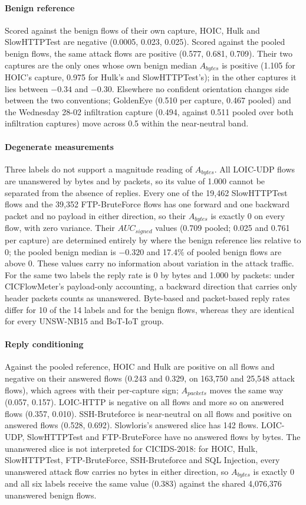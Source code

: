 \documentclass[preprint,12pt]{elsarticle}
\begin{document}
\paragraph{Benign reference} Scored against the benign flows of their own capture, HOIC, Hulk and SlowHTTPTest are negative (0.0005, 0.023, 0.025). Scored against the pooled benign flows, the same attack flows are positive (0.577, 0.681, 0.709). Their two captures are the only ones whose own benign median $A_{bytes}$ is positive (1.105 for HOIC's capture, 0.975 for Hulk's and SlowHTTPTest's); in the other captures it lies between $-0.34$ and $-0.30$. Elsewhere no confident orientation changes side between the two conventions; GoldenEye (0.510 per capture, 0.467 pooled) and the Wednesday 28-02 infiltration capture (0.494, against 0.511 pooled over both infiltration captures) move across 0.5 within the near-neutral band.

\paragraph{Degenerate measurements} Three labels do not support a magnitude reading of $A_{bytes}$. All LOIC-UDP flows are unanswered by bytes and by packets, so its value of 1.000 cannot be separated from the absence of replies. Every one of the 19{,}462 SlowHTTPTest flows and the 39{,}352 FTP-BruteForce flows has one forward and one backward packet and no payload in either direction, so their $A_{bytes}$ is exactly 0 on every flow, with zero variance. Their $AUC_{signed}$ values (0.709 pooled; 0.025 and 0.761 per capture) are determined entirely by where the benign reference lies relative to 0; the pooled benign median is $-0.320$ and 17.4\% of pooled benign flows are above 0. These values carry no information about variation in the attack traffic. For the same two labels the reply rate is 0 by bytes and 1.000 by packets: under CICFlowMeter's payload-only accounting, a backward direction that carries only header packets counts as unanswered. Byte-based and packet-based reply rates differ for 10 of the 14 labels and for the benign flows, whereas they are identical for every UNSW-NB15 and BoT-IoT group.

\paragraph{Reply conditioning} Against the pooled reference, HOIC and Hulk are positive on all flows and negative on their answered flows (0.243 and 0.329, on 163{,}750 and 25{,}548 attack flows), which agrees with their per-capture sign; $A_{packets}$ moves the same way (0.057, 0.157). LOIC-HTTP is negative on all flows and more so on answered flows (0.357, 0.010). SSH-Bruteforce is near-neutral on all flows and positive on answered flows (0.528, 0.692). Slowloris's answered slice has 142 flows. LOIC-UDP, SlowHTTPTest and FTP-BruteForce have no answered flows by bytes. The unanswered slice is not interpreted for CICIDS-2018: for HOIC, Hulk, SlowHTTPTest, FTP-BruteForce, SSH-Bruteforce and SQL Injection, every unanswered attack flow carries no bytes in either direction, so $A_{bytes}$ is exactly 0 and all six labels receive the same value (0.383) against the shared 4{,}076{,}376 unanswered benign flows.
\end{document}
